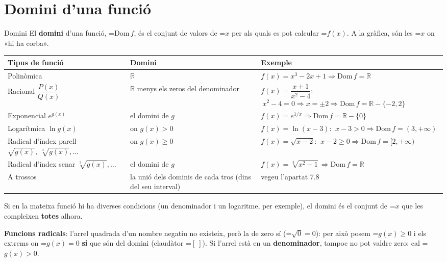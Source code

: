 \documentclass[11pt,a4paper]{article}
\newcommand{\fmm}[1]{\setbox0=\hbox{$#1$}\ifdim\wd0>\linewidth\[#1\]\else\mbox{\box0}\fi}
\newcommand{\fmuline}[1]{\textbf{\color{fmaccent}#1}}
\begin{document}
\section{Domini d'una funció}\hypertarget{sec1}{}

  

  
\begin{fmdef}{Domini}
El \textbf{domini} d'una funció, \fmm{\mathrm{Dom}\,f}, és el conjunt de valors de \fmm{x} per als quals es pot calcular \fmm{f(x)}. A la gràfica, són les \fmm{x} on «hi ha corba».

      
\begin{center}\renewcommand{\arraystretch}{1.35}\small\begin{tabularx}{\linewidth}{>{\raggedright\arraybackslash}p{3.3cm}>{\raggedright\arraybackslash}p{4.5cm}>{\raggedright\arraybackslash}X}\toprule
\textbf{Tipus de funció} & \textbf{Domini} & \textbf{Exemple}\\\midrule
Polinòmica & $\mathbb R$ & $f(x)=x^3-2x+1\Rightarrow\mathrm{Dom}\,f=\mathbb R$\\[3pt]
Racional $\dfrac{P(x)}{Q(x)}$ & $\mathbb R$ menys els zeros del denominador & $f(x)=\dfrac{x+1}{x^2-4}$: $\ x^2-4=0\Rightarrow x=\pm2\Rightarrow\mathrm{Dom}\,f=\mathbb R-\{-2,2\}$\\[3pt]
Exponencial $e^{g(x)}$ & el domini de $g$ & $f(x)=e^{1/x}\Rightarrow\mathrm{Dom}\,f=\mathbb R-\{0\}$\\[3pt]
Logarítmica $\ln g(x)$ & on $g(x)\gt0$ & $f(x)=\ln(x-3)$: $\ x-3\gt0\Rightarrow\mathrm{Dom}\,f=(3,+\infty)$\\[3pt]
Radical d'índex parell $\sqrt{g(x)},\ \sqrt[4]{g(x)},\dots$ & on $g(x)\geq0$ & $f(x)=\sqrt{x-2}$: $\ x-2\geq0\Rightarrow\mathrm{Dom}\,f=[2,+\infty)$\\[3pt]
Radical d'índex senar $\sqrt[3]{g(x)},\dots$ & el domini de $g$ & $f(x)=\sqrt[3]{x^2-1}\Rightarrow\mathrm{Dom}\,f=\mathbb R$\\[3pt]
A trossos & la unió dels dominis de cada tros (dins del seu interval) & vegeu l'apartat 7.8\\[3pt]
\bottomrule\end{tabularx}\end{center}

      
\begin{fmnote}Si en la mateixa funció hi ha diverses condicions (un denominador i un logaritme, per exemple), el domini és el conjunt de \fmm{x} que les compleixen \textbf{totes} alhora.\end{fmnote}

      
\begin{fmnote}\fmuline{Funcions radicals}: l'arrel quadrada d'un nombre negatiu no existeix, però la de zero sí (\fmm{\sqrt0=0}): per això posem \fmm{g(x)\geq0} i els extrems on \fmm{g(x)=0} \textbf{sí} que són del domini (claudàtor \fmm{[\ ]}). Si l'arrel està en un \textbf{denominador}, tampoc no pot valdre zero: cal \fmm{g(x)\gt0}.\end{fmnote}
\end{fmdef}
\end{document}
